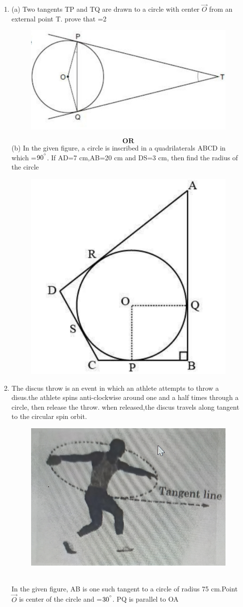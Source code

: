 \documentclass{article}
\begin{document}
\begin{enumerate}
	\item (a) Two tangents TP and TQ are drawn to a circle with center $\vec{O}$ from an external point T. prove that =2
		\begin{figure}[h]
			\centering
			\includegraphics[width=0.35\columnwidth]{Fig2.jpg}
		\end{figure}
		$$\textbf{OR}$$
		(b) In the given figure, a circle is inscribed in a quadrilaterals ABCD in which =$90^{\degree}$. If AD=7 cm,AB=20 cm and DS=3 cm, then find the radius of the circle
		\begin{figure}[h]
			\centering
			\includegraphics[width=0.335\columnwidth]{Fig3.jpg}
		\end{figure}
	\item The discus throw is an event in which an athlete attempts to throw a disus.the athlete spins anti-clockwise around one and a half times through a circle, then release the throw. when released,the discus travels along tangent to the circular spin orbit.
		\begin{figure}[h]
			\centering
			\includegraphics[width=0.35\columnwidth]{Fig4.jpg}
		\end{figure}\\
		In the given figure, AB is one such tangent to a circle of radius 75 cm.Point $\vec{O}$ is center of the circle and =$30^{\degree}$. PQ is parallel to OA
		\begin{figure}[h]
			\centering

\end{figure}
\end{enumerate}
\end{document}
